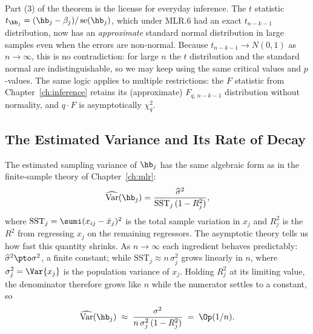 Part (3) of the theorem is the license for everyday inference. The $t$ statistic $t_{\hb_j}=(\hb_j-\beta_j)/\operatorname{se}(\hb_j)$, which under MLR.6 had an exact $t_{n-k-1}$ distribution, now has an \emph{approximate} standard normal distribution in large samples even when the errors are non-normal. Because $t_{n-k-1}\to N(0,1)$ as $n\to\infty$, this is no contradiction: for large $n$ the $t$ distribution and the standard normal are indistinguishable, so we may keep using the same critical values and $p$-values. The same logic applies to multiple restrictions: the $F$ statistic from Chapter~\ref{ch:inference} retains its (approximate) $F_{q,\,n-k-1}$ distribution without normality, and $q\cdot F$ is asymptotically $\chi^2_q$.


\subsection{The Estimated Variance and Its Rate of Decay}

The estimated sampling variance of $\hb_j$ has the same algebraic form as in the finite-sample theory of Chapter~\ref{ch:mlr}:
\[
\widehat{\operatorname{Var}}(\hb_j) = \frac{\widehat\sigma^2}{\text{SST}_j\,(1-R_j^2)},
\]
where $\text{SST}_j=\sumi(x_{ij}-\bar x_j)^2$ is the total sample variation in $x_j$ and $R_j^2$ is the $R^2$ from regressing $x_j$ on the remaining regressors. The asymptotic theory tells us how fast this quantity shrinks. As $n\to\infty$ each ingredient behaves predictably: $\widehat\sigma^2 \pto \sigma^2$, a finite constant; while $\text{SST}_j \approx n\,\sigma_j^2$ grows linearly in $n$, where $\sigma_j^2=\Var{x_j}$ is the population variance of $x_j$. Holding $R_j^2$ at its limiting value, the denominator therefore grows like $n$ while the numerator settles to a constant, so
\[
\widehat{\operatorname{Var}}(\hb_j) \;\approx\; \frac{\sigma^2}{n\,\sigma_j^2\,(1-R_j^2)} \;=\; \Op(1/n).
\]


